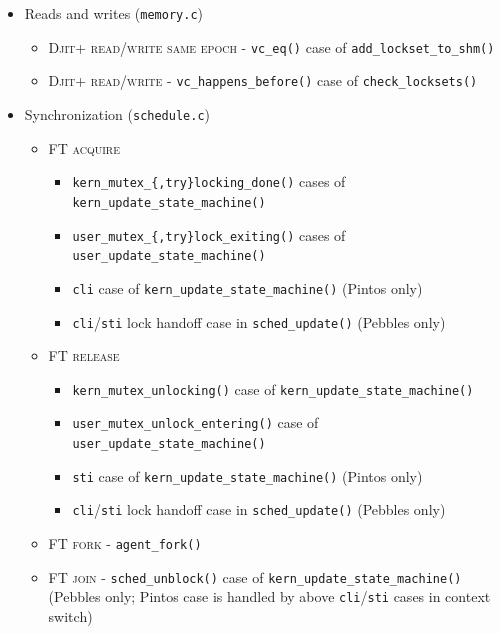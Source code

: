 \begin{itemize}
	\item Reads and writes ({\tt memory.c})
	\begin{itemize}
		\item \textsc{Djit+ read/write same epoch} - {\tt vc\_eq()} case of {\tt add\_lockset\_to\_shm()}
		\item \textsc{Djit+ read/write} - {\tt vc\_happens\_before()} case of {\tt check\_locksets()}
	\end{itemize}
	\item Synchronization ({\tt schedule.c})
	\begin{itemize}
		\item \textsc{FT acquire}
			\begin{itemize}
				\item {\tt kern\_mutex\_\{,try\}locking\_done()} cases of {\tt kern\_update\_state\_\allowbreak{}machine()}
				\item {\tt user\_mutex\_\{,try\}lock\_exiting()} cases of {\tt user\_update\_state\_\allowbreak{}machine()}
				\item {\tt cli} case of {\tt kern\_update\_state\_machine()} (Pintos only)
				\item {\tt cli}/{\tt sti} lock handoff case in {\tt sched\_update()} (Pebbles only)
			\end{itemize}
		\item \textsc{FT release}
			\begin{itemize}
				\item {\tt kern\_mutex\_unlocking()} case of {\tt kern\_update\_state\_machine()}
				\item {\tt user\_mutex\_unlock\_entering()} case of {\tt user\_update\_state\_machine()}
				\item {\tt sti} case of {\tt kern\_update\_state\_machine()} (Pintos only)
				\item {\tt cli}/{\tt sti} lock handoff case in {\tt sched\_update()} (Pebbles only)
			\end{itemize}
		\item \textsc{FT fork} - {\tt agent\_fork()}
		\item \textsc{FT join} - {\tt sched\_unblock()} case of {\tt kern\_update\_state\_machine()}
			(Pebbles only; Pintos case is handled by above {\tt cli}/{\tt sti} cases in context switch)
	\end{itemize}
\end{itemize}


